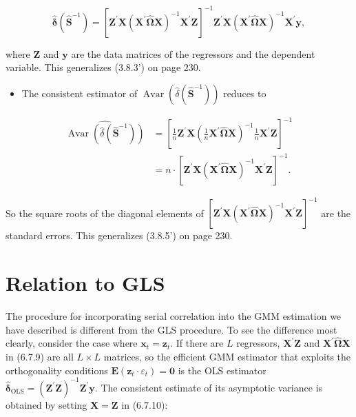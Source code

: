 \documentclass[10pt]{article}
\begin{document}
\begin{equation*}
\hat{\boldsymbol{\delta}}\left(\widehat{\mathbf{S}}^{-1}\right)=\left[\mathbf{Z}^{\prime} \mathbf{X}\left(\mathbf{X}^{\prime} \widehat{\boldsymbol{\Omega}} \mathbf{X}\right)^{-1} \mathbf{X}^{\prime} \mathbf{Z}\right]^{-1} \mathbf{Z}^{\prime} \mathbf{X}\left(\mathbf{X}^{\prime} \widehat{\mathbf{\Omega}} \mathbf{X}\right)^{-1} \mathbf{X}^{\prime} \mathbf{y}, \tag{6.7.9}
\end{equation*}


where $\mathbf{Z}$ and $\mathbf{y}$ are the data matrices of the regressors and the dependent variable. This generalizes (3.8.3') on page 230.

\begin{itemize}
  \item The consistent estimator of $\operatorname{Avar}\left(\hat{\delta}\left(\widehat{\mathbf{S}}^{-1}\right)\right)$ reduces to
\end{itemize}


\begin{align*}
\widehat{\operatorname{Avar}\left(\hat{\delta}\left(\widehat{\mathbf{S}}^{-1}\right)\right)} & =\left[\frac{1}{n} \mathbf{Z}^{\prime} \mathbf{X}\left(\frac{1}{n} \mathbf{X}^{\prime} \widehat{\mathbf{\Omega}} \mathbf{X}\right)^{-1} \frac{1}{n} \mathbf{X}^{\prime} \mathbf{Z}\right]^{-1} \\
& =n \cdot\left[\mathbf{Z}^{\prime} \mathbf{X}\left(\mathbf{X}^{\prime} \widehat{\mathbf{\Omega}} \mathbf{X}\right)^{-1} \mathbf{X}^{\prime} \mathbf{Z}\right]^{-1} . \tag{6.7.10}
\end{align*}


So the square roots of the diagonal elements of $\left[\mathbf{Z}^{\prime} \mathbf{X}\left(\mathbf{X}^{\prime} \widehat{\mathbf{\Omega}} \mathbf{X}\right)^{-1} \mathbf{X}^{\prime} \mathbf{Z}\right]^{-1}$ are the standard errors. This generalizes (3.8.5') on page 230.

\section*{Relation to GLS}
The procedure for incorporating serial correlation into the GMM estimation we have described is different from the GLS procedure. To see the difference most clearly, consider the case where $\mathbf{x}_{t}=\mathbf{z}_{t}$. If there are $L$ regressors, $\mathbf{X}^{\prime} \mathbf{Z}$ and $\mathbf{X}^{\prime} \widehat{\mathbf{\Omega}} \mathbf{X}$ in (6.7.9) are all $L \times L$ matrices, so the efficient GMM estimator that exploits the orthogonality conditions $\mathbf{E}\left(\mathbf{z}_{t} \cdot \varepsilon_{t}\right)=\mathbf{0}$ is the OLS estimator $\hat{\boldsymbol{\delta}}_{\mathrm{OLS}}=\left(\mathbf{Z}^{\prime} \mathbf{Z}\right)^{-1} \mathbf{Z}^{\prime} \mathbf{y}$. The consistent estimate of its asymptotic variance is obtained by setting $\mathbf{X}=\mathbf{Z}$ in (6.7.10):
\end{document}

